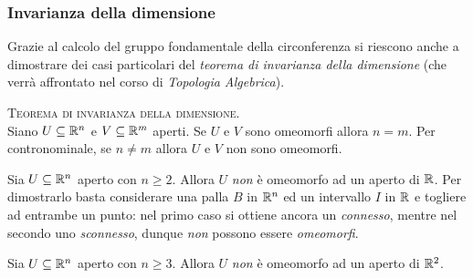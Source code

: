 \subsubsection{Invarianza della dimensione}
Grazie al calcolo del gruppo fondamentale della circonferenza si riescono anche a dimostrare dei casi particolari del \textit{teorema di invarianza della dimensione} (che verrà affrontato nel corso di \textit{Topologia Algebrica}).
\begin{theorema}\textsc{Teorema di invarianza della dimensione.}\\
	Siano $U\subseteq\mathbb{R}^n$ e $V\subseteq \mathbb{R}^m$ aperti. Se $U$ e $V$ sono omeomorfi allora $n=m$. Per contronominale, se $n\neq m$ allora $U$ e $V$ non sono omeomorfi.
\end{theorema}
\begin{example}
	Sia $U\subseteq\mathbb{R}^n$ aperto con $n\geq 2$. Allora $U$ \textit{non} è omeomorfo ad un aperto di $\mathbb{R}$. Per dimostrarlo basta considerare una palla $B$ in $\mathbb{R}^n$ ed un intervallo $I$ in $\mathbb{R}$ e togliere ad entrambe un punto: nel primo caso si ottiene ancora un \textit{connesso}, mentre nel secondo uno \textit{sconnesso}, dunque \textit{non} possono essere \textit{omeomorfi}.
\end{example}
\begin{theorema}
	Sia $U\subseteq\mathbb{R}^n$ aperto con $n\geq 3$. Allora $U$ \textit{non} è omeomorfo ad un aperto di $\mathbb{R}^2$.
\end{theorema}
